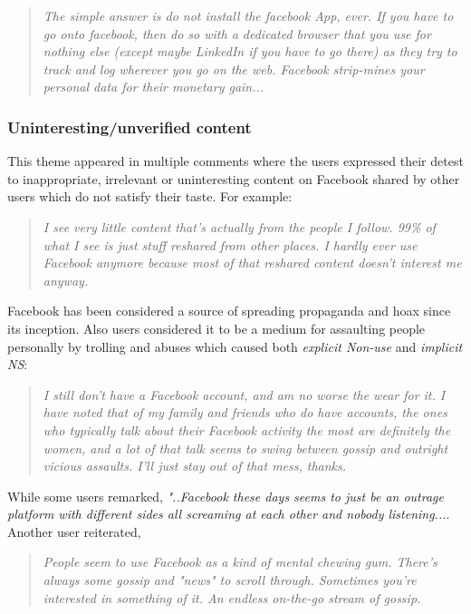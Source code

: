     \begin{quote}
         \textit{The simple answer is do not install the facebook App, ever. If you have to go onto facebook, then do so with a dedicated browser that you use for nothing else (except maybe LinkedIn if you have to go there) as they try to track and log wherever you go on the web. Facebook strip-mines your personal data for their monetary gain... }
    \end{quote}

    
 \subsubsection{Uninteresting/unverified content }
 This theme appeared in multiple comments where the users expressed their detest to inappropriate, irrelevant or uninteresting content on Facebook shared by other users which do not satisfy their taste. For example:
     \begin{quote}
         \textit{I see very little content that's actually from the people I follow. 99\% of what I see is just stuff reshared from other places. I hardly ever use Facebook anymore because most of that reshared content doesn't interest me anyway.}
     \end{quote}

Facebook has been considered a source of spreading propaganda and hoax since its inception. Also users considered it to be a medium for assaulting people personally by trolling and abuses which caused both \emph{explicit Non-use} and \emph{implicit NS}:
\begin{quote}
         \textit{I still don't have a Facebook account, and am no worse the wear for it. I have noted that of my family and friends who do have accounts, the ones who typically talk about their Facebook activity the most are definitely the women, and a lot of that talk seems to swing between gossip and outright vicious assaults. I'll just stay out of that mess, thanks.}
    \end{quote}

While some users remarked, \textit{"..Facebook these days seems to just be an outrage platform with different sides all screaming at each other and nobody listening...}. Another user reiterated,
\begin{quote}
         \textit{People seem to use Facebook as a kind of mental chewing gum. There's always some gossip and "news" to scroll through. Sometimes you're interested in something of it. An endless on-the-go stream of gossip.}
    \end{quote}

